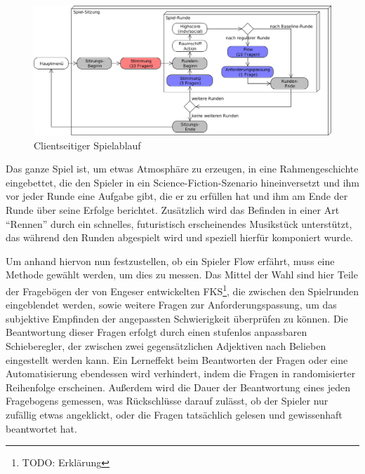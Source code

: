 \documentclass[a4paper,12pt]{scrartcl}
\begin{document}
\begin{figure}[htp]
\begin{center}
  \includegraphics[width=\textwidth]{SpielablaufClient.png}
  \caption{Clientseitiger Spielablauf}
  \label{fig:ClientSpielablauf}
\end{center}
\end{figure} 

Das ganze Spiel ist, um etwas Atmosphäre zu erzeugen, in eine Rahmengeschichte
eingebettet, die den Spieler in ein Science-Fiction-Szenario hineinversetzt und ihm vor jeder
Runde eine Aufgabe gibt, die er zu erfüllen hat und ihm am Ende der Runde über seine
Erfolge berichtet.\newline
Zusätzlich wird das Befinden in einer Art "`Rennen"' durch ein schnelles, futuristisch
erscheinendes Musikstück unterstützt, das während den Runden abgespielt wird und
speziell hierfür komponiert wurde.

Um anhand hiervon nun festzustellen, ob ein Spieler Flow erfährt, muss eine Methode
gewählt werden, um dies zu messen.\newline
Das Mittel der Wahl sind hier Teile der Fragebögen der von Engeser entwickelten
FKS\footnote{TODO: Erklärung}, die zwischen den Spielrunden eingeblendet
werden, sowie weitere Fragen zur Anforderungspassung, um das subjektive Empfinden der angepassten Schwierigkeit
überprüfen zu können. Die Beantwortung dieser Fragen erfolgt durch einen stufenlos
anpassbaren Schieberegler, der zwischen zwei gegensätzlichen Adjektiven nach
Belieben eingestellt werden kann. Ein Lerneffekt beim Beantworten der Fragen oder eine
Automatisierung ebendessen wird verhindert, indem die Fragen in randomisierter
Reihenfolge erscheinen. Außerdem
wird die Dauer der Beantwortung eines jeden Fragebogens gemessen, was Rückschlüsse
darauf zulässt, ob der Spieler nur zufällig etwas angeklickt, oder die Fragen tatsächlich
gelesen und gewissenhaft beantwortet hat.
\end{document}
